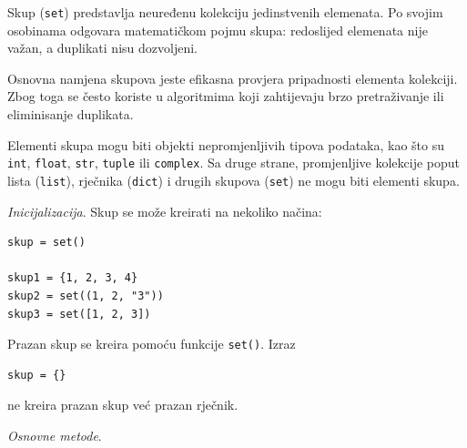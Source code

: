 Skup (\texttt{set}) predstavlja neuređenu kolekciju jedinstvenih elemenata. Po svojim osobinama odgovara matematičkom pojmu skupa: redoslijed elemenata nije važan, a duplikati nisu dozvoljeni.

Osnovna namjena skupova jeste efikasna provjera pripadnosti elementa kolekciji. Zbog toga se često koriste u algoritmima koji zahtijevaju brzo pretraživanje ili eliminisanje duplikata.

Elementi skupa mogu biti objekti nepromjenljivih tipova podataka, kao što su \texttt{int}, \texttt{float}, \texttt{str}, \texttt{tuple} ili \texttt{complex}. Sa druge strane, promjenljive kolekcije poput lista (\texttt{list}), rječnika (\texttt{dict}) i drugih skupova (\texttt{set}) ne mogu biti elementi skupa.

\textit{Inicijalizacija}.  Skup se može kreirati na nekoliko načina:

\begin{verbatim}
skup = set()

skup1 = {1, 2, 3, 4}
skup2 = set((1, 2, "3"))  
skup3 = set([1, 2, 3])
\end{verbatim}

 Prazan skup se kreira pomoću funkcije \texttt{set()}. Izraz
\begin{verbatim}
skup = {}
\end{verbatim}

ne kreira prazan skup već prazan rječnik.

\textit{Osnovne metode}. 


